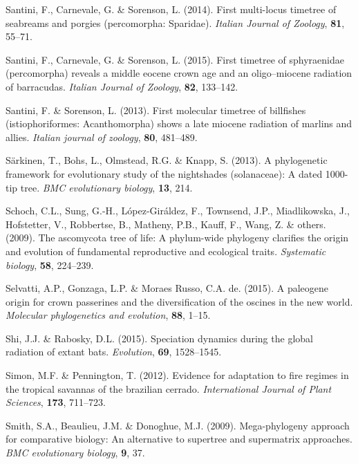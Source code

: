 \documentclass[]{article}
\begin{document}
\leavevmode\hypertarget{ref-santini2014first}{}%
Santini, F., Carnevale, G. \& Sorenson, L. (2014). First multi-locus timetree of seabreams and porgies (percomorpha: Sparidae). \emph{Italian Journal of Zoology}, \textbf{81}, 55--71.

\leavevmode\hypertarget{ref-santini2015first}{}%
Santini, F., Carnevale, G. \& Sorenson, L. (2015). First timetree of sphyraenidae (percomorpha) reveals a middle eocene crown age and an oligo--miocene radiation of barracudas. \emph{Italian Journal of Zoology}, \textbf{82}, 133--142.

\leavevmode\hypertarget{ref-santini2013first}{}%
Santini, F. \& Sorenson, L. (2013). First molecular timetree of billfishes (istiophoriformes: Acanthomorpha) shows a late miocene radiation of marlins and allies. \emph{Italian journal of zoology}, \textbf{80}, 481--489.

\leavevmode\hypertarget{ref-sarkinen2013solanaceae}{}%
Särkinen, T., Bohs, L., Olmstead, R.G. \& Knapp, S. (2013). A phylogenetic framework for evolutionary study of the nightshades (solanaceae): A dated 1000-tip tree. \emph{BMC evolutionary biology}, \textbf{13}, 214.

\leavevmode\hypertarget{ref-schoch2009ascomycota}{}%
Schoch, C.L., Sung, G.-H., López-Giráldez, F., Townsend, J.P., Miadlikowska, J., Hofstetter, V., Robbertse, B., Matheny, P.B., Kauff, F., Wang, Z. \& others. (2009). The ascomycota tree of life: A phylum-wide phylogeny clarifies the origin and evolution of fundamental reproductive and ecological traits. \emph{Systematic biology}, \textbf{58}, 224--239.

\leavevmode\hypertarget{ref-selvatti2015paleogene}{}%
Selvatti, A.P., Gonzaga, L.P. \& Moraes Russo, C.A. de. (2015). A paleogene origin for crown passerines and the diversification of the oscines in the new world. \emph{Molecular phylogenetics and evolution}, \textbf{88}, 1--15.

\leavevmode\hypertarget{ref-shi2015speciation}{}%
Shi, J.J. \& Rabosky, D.L. (2015). Speciation dynamics during the global radiation of extant bats. \emph{Evolution}, \textbf{69}, 1528--1545.

\leavevmode\hypertarget{ref-simon2012cerrado}{}%
Simon, M.F. \& Pennington, T. (2012). Evidence for adaptation to fire regimes in the tropical savannas of the brazilian cerrado. \emph{International Journal of Plant Sciences}, \textbf{173}, 711--723.

\leavevmode\hypertarget{ref-smith2009mega}{}%
Smith, S.A., Beaulieu, J.M. \& Donoghue, M.J. (2009). Mega-phylogeny approach for comparative biology: An alternative to supertree and supermatrix approaches. \emph{BMC evolutionary biology}, \textbf{9}, 37.
\end{document}
